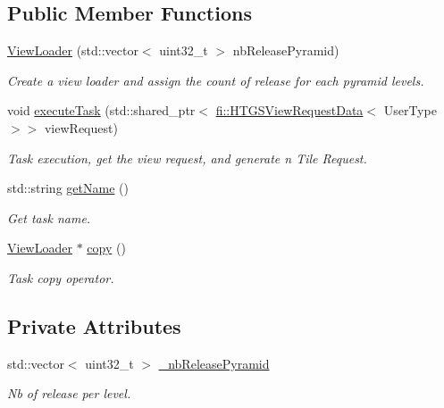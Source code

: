 \subsection*{Public Member Functions}
\begin{DoxyCompactItemize}
\item 
\hyperlink{classfi_1_1ViewLoader_ab026a286c497c820c495242122658af9}{View\+Loader} (std\+::vector$<$ uint32\+\_\+t $>$ nb\+Release\+Pyramid)
\begin{DoxyCompactList}\small\item\em Create a view loader and assign the count of release for each pyramid levels. \end{DoxyCompactList}\item 
void \hyperlink{classfi_1_1ViewLoader_a15c6540ddf5a8636511be49bb4d2844b}{execute\+Task} (std\+::shared\+\_\+ptr$<$ \hyperlink{classfi_1_1HTGSViewRequestData}{fi\+::\+H\+T\+G\+S\+View\+Request\+Data}$<$ User\+Type $>$$>$ view\+Request)
\begin{DoxyCompactList}\small\item\em Task execution, get the view request, and generate n Tile Request. \end{DoxyCompactList}\item 
std\+::string \hyperlink{classfi_1_1ViewLoader_aa4fda44b0fd88e5f4ed5b7199c6b44f6}{get\+Name} ()
\begin{DoxyCompactList}\small\item\em Get task name. \end{DoxyCompactList}\item 
\hyperlink{classfi_1_1ViewLoader}{View\+Loader} $\ast$ \hyperlink{classfi_1_1ViewLoader_aa7d11a576a793de8b4c870c40534b75d}{copy} ()
\begin{DoxyCompactList}\small\item\em Task copy operator. \end{DoxyCompactList}\end{DoxyCompactItemize}
\subsection*{Private Attributes}
\begin{DoxyCompactItemize}
\item 
std\+::vector$<$ uint32\+\_\+t $>$ \hyperlink{classfi_1_1ViewLoader_ab54e6c5792ff386f94cdaa685c438c50}{\+\_\+nb\+Release\+Pyramid}
\begin{DoxyCompactList}\small\item\em Nb of release per level. \end{DoxyCompactList}\end{DoxyCompactItemize}


